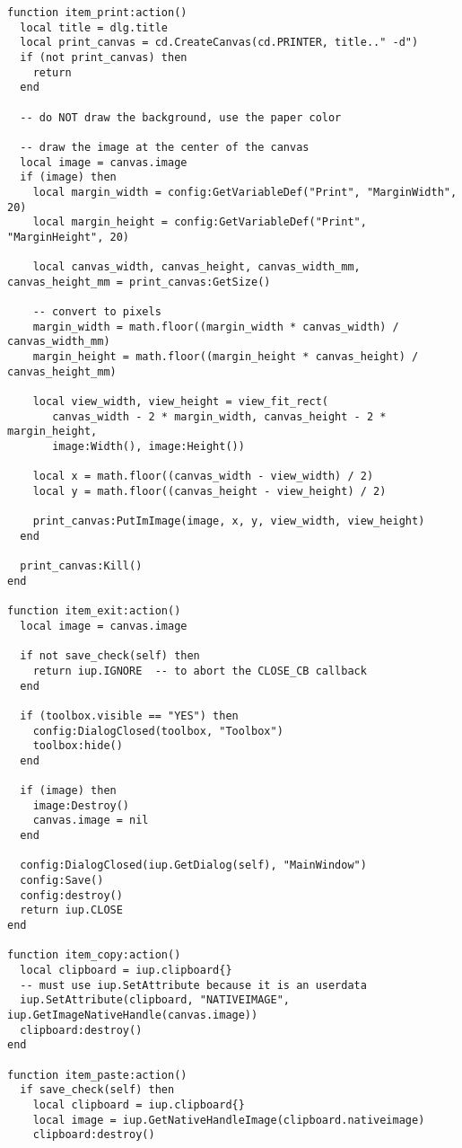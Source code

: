 \documentclass{ctexart}
\begin{document}
\begin{lstlisting}
function item_print:action()
  local title = dlg.title
  local print_canvas = cd.CreateCanvas(cd.PRINTER, title.." -d")
  if (not print_canvas) then
    return
  end

  -- do NOT draw the background, use the paper color 

  -- draw the image at the center of the canvas
  local image = canvas.image
  if (image) then
    local margin_width = config:GetVariableDef("Print", "MarginWidth", 20)
    local margin_height = config:GetVariableDef("Print", "MarginHeight", 20)

    local canvas_width, canvas_height, canvas_width_mm, canvas_height_mm = print_canvas:GetSize()

    -- convert to pixels
    margin_width = math.floor((margin_width * canvas_width) / canvas_width_mm)
    margin_height = math.floor((margin_height * canvas_height) / canvas_height_mm)

    local view_width, view_height = view_fit_rect(
       canvas_width - 2 * margin_width, canvas_height - 2 * margin_height, 
       image:Width(), image:Height())

    local x = math.floor((canvas_width - view_width) / 2)
    local y = math.floor((canvas_height - view_height) / 2)

    print_canvas:PutImImage(image, x, y, view_width, view_height)
  end

  print_canvas:Kill()
end

function item_exit:action()
  local image = canvas.image

  if not save_check(self) then
    return iup.IGNORE  -- to abort the CLOSE_CB callback
  end
  
  if (toolbox.visible == "YES") then
    config:DialogClosed(toolbox, "Toolbox")
    toolbox:hide()
  end

  if (image) then
    image:Destroy()
    canvas.image = nil
  end
  
  config:DialogClosed(iup.GetDialog(self), "MainWindow")
  config:Save()
  config:destroy()
  return iup.CLOSE
end

function item_copy:action()
  local clipboard = iup.clipboard{}
  -- must use iup.SetAttribute because it is an userdata
  iup.SetAttribute(clipboard, "NATIVEIMAGE", iup.GetImageNativeHandle(canvas.image))
  clipboard:destroy()
end

function item_paste:action()
  if save_check(self) then
    local clipboard = iup.clipboard{}
    local image = iup.GetNativeHandleImage(clipboard.nativeimage)
    clipboard:destroy()


\end{lstlisting}
\end{document}
